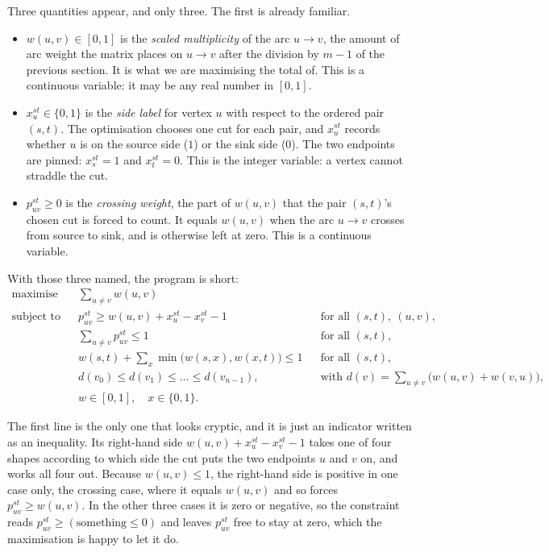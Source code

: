 Three quantities appear, and only three. The first is already familiar.
\begin{itemize}
    \item $w(u,v) \in [0,1]$ is the \emph{scaled multiplicity} of the arc $u \to v$, the amount of arc weight the matrix places on $u \to v$ after the division by $m-1$ of the previous section. It is what we are maximising the total of. This is a continuous variable: it may be any real number in $[0,1]$.
    \item $x^{st}_u \in \{0,1\}$ is the \emph{side label} for vertex $u$ with respect to the ordered pair $(s,t)$. The optimisation chooses one cut for each pair, and $x^{st}_u$ records whether $u$ is on the source side ($1$) or the sink side ($0$). The two endpoints are pinned: $x^{st}_s = 1$ and $x^{st}_t = 0$. This is the integer variable: a vertex cannot straddle the cut.
    \item $p^{st}_{uv} \ge 0$ is the \emph{crossing weight}, the part of $w(u,v)$ that the pair $(s,t)$'s chosen cut is forced to count. It equals $w(u,v)$ when the arc $u \to v$ crosses from source to sink, and is otherwise left at zero. This is a continuous variable.
\end{itemize}
With those three named, the program is short:
\begin{align*}
    \text{maximise} \quad & \sum_{u \ne v} w(u, v) \\
    \text{subject to} \quad & p^{st}_{uv} \ge w(u, v) + x^{st}_u - x^{st}_v - 1 && \text{for all } (s,t),\ (u,v), \\
    & \sum_{u \ne v} p^{st}_{uv} \le 1 && \text{for all } (s,t), \\
    & w(s,t) + \sum_{x} \min\bigl(w(s,x), w(x,t)\bigr) \le 1 && \text{for all } (s,t), \\
    & d(v_0) \le d(v_1) \le \dots \le d(v_{n-1}), && \text{with } d(v) = \textstyle\sum_{u \ne v} \bigl(w(u,v) + w(v,u)\bigr), \\
    & w \in [0,1], \quad x \in \{0,1\}.
\end{align*}

The first line is the only one that looks cryptic, and it is just an indicator written as an inequality. Its right-hand side $w(u,v) + x^{st}_u - x^{st}_v - 1$ takes one of four shapes according to which side the cut puts the two endpoints $u$ and $v$ on, and  works all four out. Because $w(u,v) \le 1$, the right-hand side is positive in one case only, the crossing case, where it equals $w(u,v)$ and so forces $p^{st}_{uv} \ge w(u,v)$. In the other three cases it is zero or negative, so the constraint reads $p^{st}_{uv} \ge (\text{something} \le 0)$ and leaves $p^{st}_{uv}$ free to stay at zero, which the maximisation is happy to let it do.


